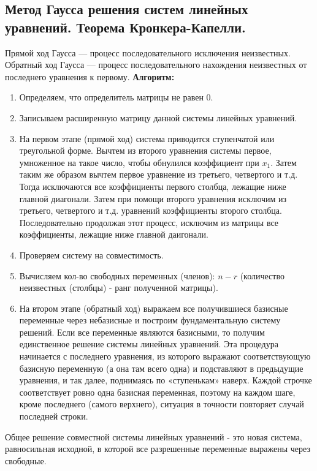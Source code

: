 \documentclass[a4paper,14pt]{article}
\begin{document}
\subsection{Метод Гаусса решения систем линейных уравнений. Теорема Кронкера-Капелли.}
Прямой ход Гаусса — процесс последовательного исключения неизвестных.
Обратный ход Гаусса — процесс последовательного нахождения неизвестных от последнего уравнения к первому.
\noindent \textbf{Алгоритм:}
\begin{enumerate}
	\item Определяем, что определитель матрицы не равен 0.
	\item Записываем расширенную матрицу данной системы линейных уравнений.
	\item На первом этапе (прямой ход) система приводится ступенчатой или треугольной форме. Вычтем из второго уравнения системы первое, умноженное на такое число, чтобы обнулился коэффициент при $x_1$. Затем таким же образом вычтем первое уравнение из третьего, четвертого и т.д. Тогда исключаются все коэффициенты первого столбца, лежащие ниже главной диагонали. Затем при помощи второго уравнения исключим из третьего, четвертого и т.д. уравнений коэффициенты второго столбца. Последовательно продолжая этот процесс, исключим из матрицы все коэффициенты, лежащие ниже главной даигонали.
	\item Проверяем систему на совместимость.
	\item Вычисляем кол-во свободных переменных (членов): $n-r$ (количество неизвестных (столбцы) - ранг полученной матрицы).
	\item На втором этапе (обратный ход) выражаем все получившиеся базисные переменные через небазисные и построим фундаментальную систему решений. Если все переменные являются базисными, то получим единственное решение системы линейных уравнений. Эта процедура начинается с последнего уравнения, из которого выражают соответствующую базисную переменную (а она там всего одна) и подставляют в предыдущие уравнения, и так далее, поднимаясь по «ступенькам» наверх. Каждой строчке соответствует ровно одна базисная переменная, поэтому на каждом шаге, кроме последнего (самого верхнего), ситуация в точности повторяет случай последней строки.
\end{enumerate}
\noindent Общее решение совместной системы линейных уравнений - это новая система, равносильная исходной, в которой все разрешенные переменные выражены через свободные.
\end{document}
